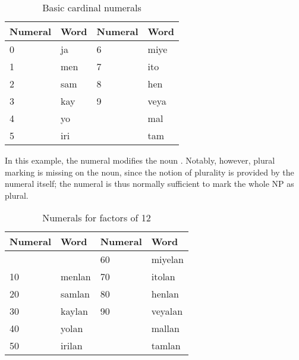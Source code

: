 \begin{table}[p]\centering
\caption{Basic cardinal numerals}
\begin{tabu} to .75\linewidth {X[c] I X[c] I}
\toprule\tableheaderfont
Numeral
	& Word
	& Numeral
	& Word
	\\
\toprule

0
	& ja %
	& 6
	& miye %
	\\

1
	& men %
	& 7
	& ito %
	\\
	
2
	& sam %
	& 8
	& hen %
	\\
	
3
	& kay %
	& 9
	& veya %
	\\

4
	& yo %
	& \ten
	& mal %
	\\

5
	& iri %
	& \elv
	& tam %
	\\

\bottomrule
\end{tabu}
\label{tab:cardinals}
\end{table}

In this example, the numeral  modifies the noun 
. Notably, however, plural marking is missing on the 
noun, since the notion of plurality is provided by the numeral itself; the 
numeral is thus normally sufficient to mark the whole NP as plural.

\begin{table}[p]\centering
\caption{Numerals for factors of 12}
\begin{tabu} to .75\linewidth {X[c] I X[c] I}
\toprule\tableheaderfont
Numeral
	& Word
	& Numeral
	& Word
	\\
\toprule

%
	& %
	& 60
	& miyelan %
	\\

10 
	& menlan %
	& 70
	& itolan %
	\\

20 
	& samlan %
	& 80
	& henlan %
	\\

30 
	& kaylan %
	& 90
	& veyalan %
	\\

40 
	& yolan %
	& 
	& mallan %
	\\

50 
	& irilan %
	& 
	& tamlan %
	\\

\bottomrule
\end{tabu}
\label{tab:cardinalsten}
\end{table}

